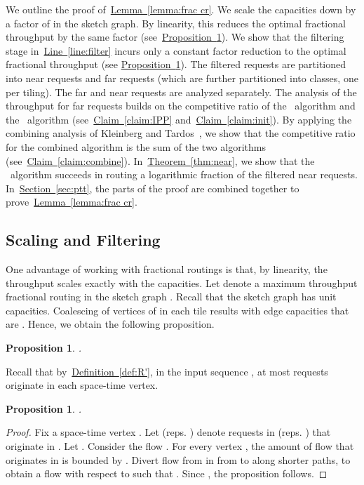 \documentclass[11pt]{article}
\newtheorem{proposition}[theorem]{Proposition}
\newcommand{\namedref}[2]{\hyperref[#2]{#1~\ref*{#2}}}
\newcommand{\sectionref}[1]{\namedref{Section}{#1}}
\newcommand{\theoremref}[1]{\namedref{Theorem}{#1}}
\newcommand{\defref}[1]{\namedref{Definition}{#1}}
\newcommand{\claimref}[1]{\namedref{Claim}{#1}}
\newcommand{\lemmaref}[1]{\namedref{Lemma}{#1}}
\newcommand{\propref}[1]{\namedref{Proposition}{#1}}
\newcommand{\lineref}[1]{\namedref{Line}{#1}}
\newcommand{\route}{\text{\sc{ipp}}\xspace}
\newcommand{\IPP}{\route}
\newcommand{\routenear}{\text{\sc{route-near}}\xspace}
\newcommand{\initroute}{\text{\sc{initial-route}}\xspace}
\newenvironment{proof sketch}[1]{\noindent {\emph{Proof sketch of #1:}}}{\hfill \qed}
\begin{document}
We outline the proof of~\lemmaref{lemma:frac cr}.  We scale the capacities down by a
factor of  in the sketch graph.  By linearity, this reduces
the optimal fractional throughput by the same factor (see~\propref{prop:scale}).  We
show that the filtering stage in~\lineref{line:filter} incurs only a constant factor
reduction to the optimal fractional throughput (see \propref{prop:R'}).  The filtered
requests  are partitioned into near requests and far requests (which are further
partitioned into  classes, one per tiling). The far and near requests are analyzed
separately.  The analysis of the throughput for far requests builds on the competitive
ratio of the \IPP\ algorithm and the \initroute\ algorithm (see~\claimref{claim:IPP}
and~\claimref{claim:init}). By applying the combining analysis of Kleinberg and
Tardos~\cite{KT}, we show that the competitive ratio for the combined algorithm is
the sum of the two algorithms (see~\claimref{claim:combine}).
In~\theoremref{thm:near}, we show that the \routenear\ algorithm succeeds in routing
a logarithmic fraction of the filtered near requests.  In~\sectionref{sec:ptt}, the
parts of the proof are combined together to prove~\lemmaref{lemma:frac cr}.

\subsection{Scaling and Filtering}
One advantage of working with fractional routings is that, by linearity, the
throughput scales exactly with the capacities.  Let  denote a maximum
throughput fractional routing in the sketch graph .  Recall that the sketch
graph has unit capacities. Coalescing of vertices of  in each tile results with
edge capacities that are . Hence, we obtain the following
proposition.
\begin{proposition}\label{prop:scale}
  .
\end{proposition}

\noindent
Recall that by~\defref{def:R'}, in the input sequence , at most  requests
originate in each space-time vertex.
\begin{proposition}\label{prop:R'}
.
\end{proposition}
\begin{proof}
  Fix a space-time vertex .  Let  (reps. ) denote requests in
   (reps. ) that originate in . Let . Consider the flow .  For
  every vertex , the amount of flow that originates in  is bounded by .  Divert flow from in  from  to  along shorter
  paths, to obtain a flow  with respect to  such that . Since
  , the proposition follows.
\end{proof}
\end{document}
